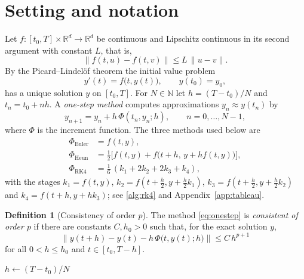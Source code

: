 \documentclass[a4paper,10pt,twocolumn]{article}
\theoremstyle{plain}
\theoremstyle{definition}
\newtheorem{definition}{Definition}
\theoremstyle{remark}
\newcommand{\R}{\mathbb{R}}
\newcommand{\norm}[1]{\lVert #1\rVert}
\begin{document}
\section{Setting and notation}\label{sec:setting}
Let $f\colon[t_0,T]\times\R^d\to\R^d$ be continuous and Lipschitz continuous in its second argument with constant $L$, that is,
\begin{equation}\label{eq:lipschitz}
  \norm{f(t,u)-f(t,v)}\le L\,\norm{u-v}.
\end{equation}
By the Picard--Lindel\"of theorem the initial value problem
\begin{equation}\label{eq:ivp}
  y'(t)=f\bigl(t,y(t)\bigr),\qquad y(t_0)=y_0,
\end{equation}
has a unique solution $y$ on $[t_0,T]$. For $N\in\mathbb N$ let $h=(T-t_0)/N$ and $t_n=t_0+nh$. A \emph{one-step method} computes approximations $y_n\approx y(t_n)$ by
\begin{equation}\label{eq:onestep}
  y_{n+1}=y_n+h\,\Phi(t_n,y_n;h),\qquad n=0,\dots,N-1,
\end{equation}
where $\Phi$ is the increment function. The three methods used below are
\begin{align}
  \Phi_{\mathrm{Euler}} &= f(t,y),\\
  \Phi_{\mathrm{Heun}}  &= \tfrac12\bigl[f(t,y)+f\bigl(t+h,\,y+h f(t,y)\bigr)\bigr],\\
  \Phi_{\mathrm{RK4}}   &= \tfrac16\,(k_1+2k_2+2k_3+k_4),
\end{align}
with the stages $k_1=f(t,y)$, $k_2=f(t+\tfrac h2,y+\tfrac h2k_1)$, $k_3=f(t+\tfrac h2,y+\tfrac h2k_2)$ and $k_4=f(t+h,y+hk_3)$; see \cref{alg:rk4} and Appendix~\ref{app:tableau}.

\begin{definition}[Consistency of order $p$]\label{def:consistency}
The method \eqref{eq:onestep} is \emph{consistent of order $p$} if there are constants $C,h_0>0$ such that, for the exact solution $y$,
\begin{equation}\label{eq:consistency}
  \norm{y(t+h)-y(t)-h\,\Phi\bigl(t,y(t);h\bigr)}\le C\,h^{p+1}
\end{equation}
for all $0<h\le h_0$ and $t\in[t_0,T-h]$.
\end{definition}

\begin{algorithm}[t]
  \caption{One integration with the classical Runge--Kutta method (RK4)}\label{alg:rk4}
  $h\leftarrow (T-t_0)/N$\;
\end{algorithm}
\end{document}
